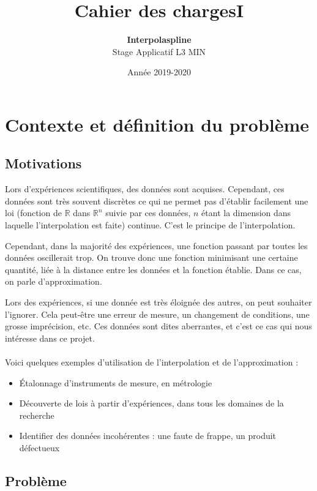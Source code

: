 \documentclass[a4paper,12pt]{article}
\title{Cahier des chargesI}
\author{\textbf{Interpolaspline}\\Stage Applicatif L3 MIN}
\date{Année 2019-2020}
\newcommand{\IKex}[2]{\mathbb{#1}^{#2}}
\newcommand{\IK}[1]{\mathbb{#1}}
\newcommand{\IRex}[1]{\IKex{R}{#1}}
\newcommand{\IR}{\IK{R}}
\begin{document}
\maketitle
\tableofcontents

\newpage

\section{Contexte et définition du problème}

\subsection{Motivations}

Lors d'expériences scientifiques, des données sont acquises. Cependant, ces données sont très souvent discrètes ce qui ne permet pas d'établir facilement une loi (fonction de $\IR$ dans $\IRex{n}$ suivie par ces données, $n$ étant la dimension dans laquelle l'interpolation est faite) continue. C'est le principe de l'interpolation.

Cependant, dans la majorité des expériences, une fonction passant par toutes les données oscillerait trop. On trouve donc une fonction minimisant une certaine quantité, liée à la distance entre les données et la fonction établie. Dans ce cas, on parle d'approximation.

Lors des expériences, si une donnée est très éloignée des autres, on peut souhaiter l'ignorer. Cela peut-être une erreur de mesure, un changement de conditions, une grosse imprécision, etc. Ces données sont dites aberrantes, et c'est ce cas qui nous intéresse dans ce projet.
\\ \\
Voici quelques exemples d'utilisation de l'interpolation et de l'approximation :
\begin{itemize}
\item Étalonnage d'instruments de mesure, en métrologie
\item Découverte de lois à partir d'expériences, dans tous les domaines de la recherche
\item Identifier des données incohérentes : une faute de frappe, un produit défectueux
\end{itemize}


\subsection{Problème}
\end{document}
